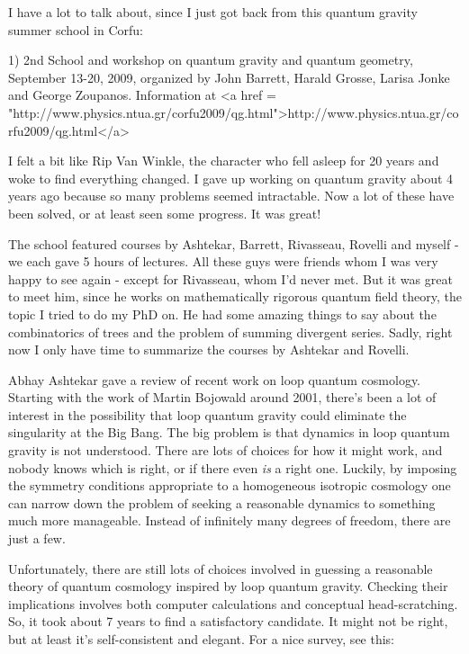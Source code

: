


I have a lot to talk about, since I just got back from this quantum
gravity summer school in Corfu:

1) 2nd School and workshop on quantum gravity and quantum geometry,
September 13-20, 2009, organized by John Barrett, Harald Grosse,
Larisa Jonke and George Zoupanos.  Information at
<a href = "http://www.physics.ntua.gr/corfu2009/qg.html">http://www.physics.ntua.gr/corfu2009/qg.html</a>

I felt a bit like Rip Van Winkle, the character who fell asleep for 20
years and woke to find everything changed.  I gave up working on
quantum gravity about 4 years ago because so many problems seemed
intractable.  Now a lot of these have been solved, or at least seen
some progress.  It was great!

The school featured courses by Ashtekar, Barrett, Rivasseau, Rovelli
and myself - we each gave 5 hours of lectures.  All these guys were
friends whom I was very happy to see again - except for Rivasseau, whom
I'd never met.  But it was great to meet him, since he works on
mathematically rigorous quantum field theory, the topic I tried to do
my PhD on.  He had some amazing things to say about the combinatorics
of trees and the problem of summing divergent series.  Sadly, right
now I only have time to summarize the courses by Ashtekar and Rovelli.

Abhay Ashtekar gave a review of recent work on loop quantum cosmology.
Starting with the work of Martin Bojowald around 2001, there's been a
lot of interest in the possibility that loop quantum gravity could
eliminate the singularity at the Big Bang.  The big problem is that
dynamics in loop quantum gravity is not understood.  There are lots of
choices for how it might work, and nobody knows which is right, or if
there even \emph{is} a right one.  Luckily, by imposing the symmetry
conditions appropriate to a homogeneous isotropic cosmology one can
narrow down the problem of seeking a reasonable dynamics to something
much more manageable.  Instead of infinitely many degrees of freedom,
there are just a few.

Unfortunately, there are still lots of choices involved in guessing a
reasonable theory of quantum cosmology inspired by loop quantum
gravity.  Checking their implications involves both computer
calculations and conceptual head-scratching.  So, it took about 7
years to find a satisfactory candidate.  It might not be right, but at
least it's self-consistent and elegant.  For a nice survey, see this:

